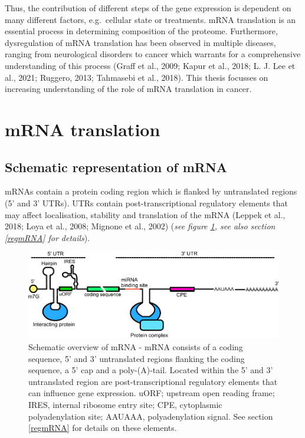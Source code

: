 \documentclass[12pt,openany]{book}
\begin{document}
Thus, the contribution of different steps of the gene expression is
dependent on many different factors, e.g.~cellular state or treatments.
mRNA translation is an essential process in determining composition of
the proteome. Furthermore, dysregulation of mRNA translation has been
observed in multiple diseases, ranging from neurological disorders to
cancer which warrants for a comprehensive understanding of this process
(Graff et al., 2009; Kapur et al., 2018; L. J. Lee et al., 2021;
Ruggero, 2013; Tahmasebi et al., 2018). This thesis focusses on
increasing understanding of the role of mRNA translation in cancer.
\newline
\section{mRNA translation} \subsection{Schematic representation of mRNA}
mRNAs contain a protein coding region which is flanked by untranslated
regions (5' and 3' UTRs). UTRs contain post-transcriptional regulatory
elements that may affect localisation, stability and translation of the
mRNA (Leppek et al., 2018; Loya et al., 2008; Mignone et al., 2002)
(\emph{see figure \ref{fig:UTRFeat}, see also section \ref{regmRNA} for
details}).

\begin{figure}[H]
  \includegraphics{./figures/UTRFeatures_2.pdf}
  \caption{ Schematic overview of mRNA - mRNA consists of a coding sequence, 5' and 3' untranslated regions flanking the coding sequence, a 5' cap and a poly-(A)-tail. Located within the 5' and 3' untranslated region are post-transcriptional regulatory elements that can influence gene expression. uORF; upstream open reading frame; IRES, internal ribosome entry site; CPE, cytoplasmic polyadenylation site; AAUAAA, polyadenylation signal. See section \ref{regmRNA} for details on these elements.
 \label{fig:UTRFeat}}
\end{figure}
\end{document}
